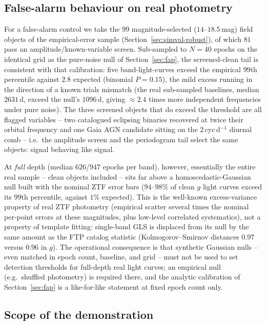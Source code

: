 \documentclass[apj]{emulateapj}
\begin{document}
\subsection{False-alarm behaviour on real photometry}
\label{sec:ztfdemo-fap}

For a false-alarm control we take the $99$ magnitude-selected
($14$--$18.5$\,mag) field objects of the empirical-error sample
(Section~\ref{sec:simval-robust}), of which $81$ pass an amplitude/known-variable
screen.  Sub-sampled to $N=40$ epochs on the identical grid as the
pure-noise null of Section~\ref{sec:fap}, the screened-clean tail is consistent
with that calibration: five band-light-curves exceed the empirical $99$th
percentile against $2.8$ expected (binomial $P = 0.15$), the mild excess
running in the direction of a known trials mismatch (the real sub-sampled
baselines, median $2631$\,d, exceed the null's $1096$\,d, giving ${\approx}2.4$
times more independent frequencies under pure noise).  The three screened
objects that do exceed the threshold are all flagged variables -- two
catalogued eclipsing binaries recovered at twice their orbital frequency and
one Gaia AGN candidate sitting on the $2$\,cyc\,d$^{-1}$ diurnal comb -- i.e.\
the amplitude screen and the periodogram tail select the same objects: signal
behaving like signal.

At \emph{full} depth (median $626$/$947$ epochs per band), however, essentially
the entire real sample -- clean objects included -- sits far above a
homoscedastic-Gaussian null built with the nominal ZTF error bars ($94$--$98\%$
of clean $g$ light curves exceed its $99$th percentile, against $1\%$ expected).
This is the well-known excess-variance property of real ZTF photometry
(empirical scatter several times the nominal per-point errors at these
magnitudes, plus low-level correlated systematics), not a property of template
fitting: single-band GLS is displaced from its null by the same amount as the
FTP catalog statistic (Kolmogorov--Smirnov distances $0.97$ versus $0.96$ in
$g$).  The operational consequence is that synthetic Gaussian nulls -- even
matched in epoch count, baseline, and grid -- must not be used to set detection
thresholds for full-depth real light curves; an empirical null (e.g.\ shuffled
photometry) is required there, and the analytic calibration of
Section~\ref{sec:fap} is a like-for-like statement at fixed epoch count only.

\subsection{Scope of the demonstration}
\label{sec:ztfdemo-scope}
\end{document}
